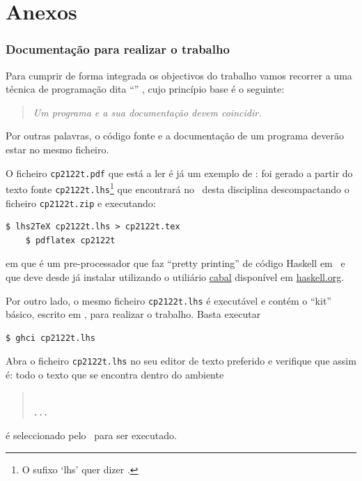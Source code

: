 \documentclass[a4paper]{article}
\begin{document}
\part*{Anexos}

\appendix

\section{Documentação para realizar o trabalho}
\label{sec:documentacao}
Para cumprir de forma integrada os objectivos do trabalho vamos recorrer
a uma técnica de programa\-ção dita ``'' \cite{Kn92},
cujo princípio base é o seguinte:
%
\begin{quote}\em Um programa e a sua documentação devem coincidir.
\end{quote}
%
Por outras palavras, o código fonte e a documentação de um
programa deverão estar no mesmo ficheiro.

O ficheiro \texttt{cp2122t.pdf} que está a ler é já um exemplo de
: foi gerado a partir do texto fonte
\texttt{cp2122t.lhs}\footnote{O sufixo `lhs' quer dizer
\emph{}.} que encontrará no
\MaterialPedagogico\ desta disciplina descompactando o ficheiro
\texttt{cp2122t.zip} e executando:
\begin{Verbatim}[fontsize=\small]
    $ lhs2TeX cp2122t.lhs > cp2122t.tex
    $ pdflatex cp2122t
\end{Verbatim}
em que \href{https://hackage.haskell.org/package/lhs2tex}{\texttt\LhsToTeX} é
um pre-processador que faz ``pretty printing''
de código Haskell em \Latex\ e que deve desde já instalar utilizando o
utiliário \href{https://www.haskell.org/cabal/}{cabal} disponível em \href{https://www.haskell.org}{haskell.org}.

Por outro lado, o mesmo ficheiro \texttt{cp2122t.lhs} é executável e contém
o ``kit'' básico, escrito em \Haskell, para realizar o trabalho. Basta executar
\begin{Verbatim}[fontsize=\small]
    $ ghci cp2122t.lhs
\end{Verbatim}

\noindent Abra o ficheiro \texttt{cp2122t.lhs} no seu editor de texto preferido
e verifique que assim é: todo o texto que se encontra dentro do ambiente
\begin{quote}\small\tt
{}
\\ ... \\
\end{quote}
é seleccionado pelo \GHCi\ para ser executado.
\end{document}

